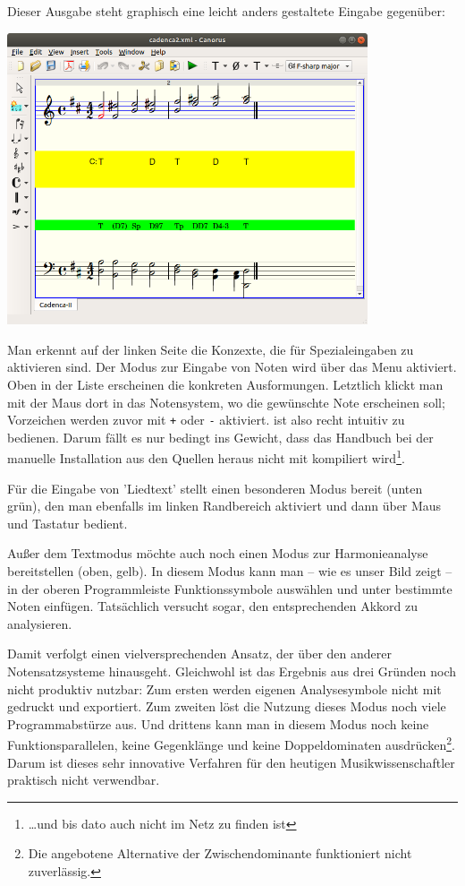 Dieser Ausgabe steht graphisch eine leicht anders gestaltete Eingabe gegenüber:

\begin{center}
\includegraphics[width=0.8\textwidth]{frontends/canorus/cadenca2-canorus}
\end{center}

Man erkennt auf der linken Seite die Konzexte, die für Spezialeingaben zu
aktivieren sind. Der Modus zur Eingabe von Noten wird über das Menu aktiviert.
Oben in der Liste erscheinen die konkreten Ausformungen. Letztlich klickt man
mit der Maus dort in das Notensystem, wo die gewünschte Note erscheinen soll;
Vorzeichen werden zuvor mit \texttt{+} oder \texttt{-} aktiviert. 
ist also recht intuitiv zu bedienen. Darum fällt es nur bedingt ins Gewicht, dass
das Handbuch bei der manuelle Installation aus den Quellen heraus nicht mit
kompiliert wird\footnote{\ldots und bis dato auch nicht im Netz zu finden ist}.

Für die Eingabe von 'Liedtext' stellt  einen besonderen Modus
bereit (unten grün), den man ebenfalls im linken Randbereich aktiviert und dann
über Maus und Tastatur bedient.

Außer dem Textmodus möchte  auch noch einen Modus zur
Harmonieanalyse bereitstellen (oben, gelb). In diesem Modus kann man -- wie es
unser Bild zeigt -- in der oberen Programmleiste Funktionssymbole auswählen und
unter bestimmte Noten einfügen. Tatsächlich versucht  sogar, den
entsprechenden Akkord zu analysieren.

Damit verfolgt  einen vielversprechenden Ansatz, der über den
anderer Notensatzsysteme hinausgeht. Gleichwohl ist das Ergebnis aus drei
Gründen noch nicht produktiv nutzbar: Zum ersten werden  eigenen
Analysesymbole nicht mit gedruckt und exportiert. Zum zweiten löst die Nutzung
dieses Modus noch viele Pro\-gramm\-ab\-stürze aus. Und drittens kann man in diesem
Modus noch keine Funktionsparallelen, keine Gegenklänge und keine
Doppeldominaten ausdrücken\footnote{Die angebotene Alternative der
Zwischendominante funktioniert nicht zuverlässig.}. Darum ist dieses sehr
innovative Verfahren für den heutigen Musikwissenschaftler praktisch nicht
verwendbar.

